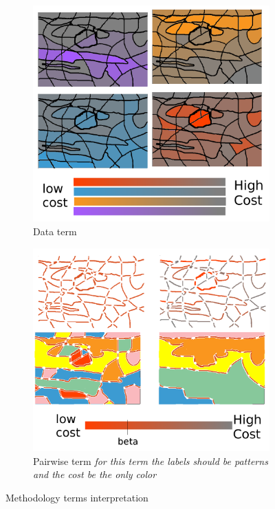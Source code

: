 \begin{figure}
\begin{subfigure}[b]{0.39\textwidth}
        \includegraphics[width=\textwidth]{data}
        \caption[]%
        {{\small Data term}}    
        \label{fig:methodTerms:data}
    \end{subfigure}
    \hfill
    \begin{subfigure}[b]{0.39\textwidth}   
        \centering 
        \includegraphics[width=\textwidth]{smooth}
        \caption[]%
        {{\small Pairwise term \emph{for this term the labels should be patterns and the cost be the only color}}}    
        \label{fig:methodTerms:boundary}
    \end{subfigure}
    \caption {\small Methodology terms interpretation} 
    \label{fig:methodterms}
\end{figure}

